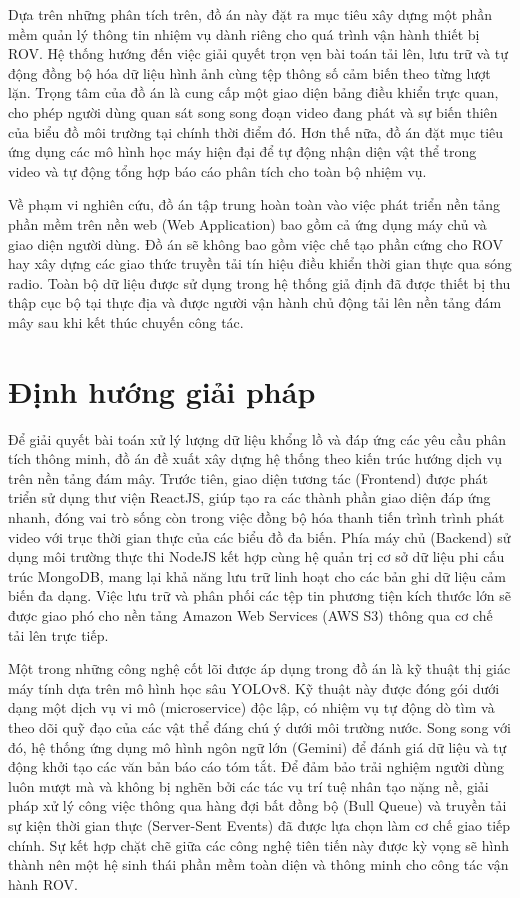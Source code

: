 \documentclass[../DoAn.tex]{subfiles}
\begin{document}
Dựa trên những phân tích trên, đồ án này đặt ra mục tiêu xây dựng một phần mềm quản lý thông tin nhiệm vụ dành riêng cho quá trình vận hành thiết bị ROV. Hệ thống hướng đến việc giải quyết trọn vẹn bài toán tải lên, lưu trữ và tự động đồng bộ hóa dữ liệu hình ảnh cùng tệp thông số cảm biến theo từng lượt lặn. Trọng tâm của đồ án là cung cấp một giao diện bảng điều khiển trực quan, cho phép người dùng quan sát song song đoạn video đang phát và sự biến thiên của biểu đồ môi trường tại chính thời điểm đó. Hơn thế nữa, đồ án đặt mục tiêu ứng dụng các mô hình học máy hiện đại để tự động nhận diện vật thể trong video và tự động tổng hợp báo cáo phân tích cho toàn bộ nhiệm vụ.

Về phạm vi nghiên cứu, đồ án tập trung hoàn toàn vào việc phát triển nền tảng phần mềm trên nền web (Web Application) bao gồm cả ứng dụng máy chủ và giao diện người dùng. Đồ án sẽ không bao gồm việc chế tạo phần cứng cho ROV hay xây dựng các giao thức truyền tải tín hiệu điều khiển thời gian thực qua sóng radio. Toàn bộ dữ liệu được sử dụng trong hệ thống giả định đã được thiết bị thu thập cục bộ tại thực địa và được người vận hành chủ động tải lên nền tảng đám mây sau khi kết thúc chuyến công tác.

\section{Định hướng giải pháp}
\label{section:1.3}
Để giải quyết bài toán xử lý lượng dữ liệu khổng lồ và đáp ứng các yêu cầu phân tích thông minh, đồ án đề xuất xây dựng hệ thống theo kiến trúc hướng dịch vụ trên nền tảng đám mây. Trước tiên, giao diện tương tác (Frontend) được phát triển sử dụng thư viện ReactJS, giúp tạo ra các thành phần giao diện đáp ứng nhanh, đóng vai trò sống còn trong việc đồng bộ hóa thanh tiến trình trình phát video với trục thời gian thực của các biểu đồ đa biến. Phía máy chủ (Backend) sử dụng môi trường thực thi NodeJS kết hợp cùng hệ quản trị cơ sở dữ liệu phi cấu trúc MongoDB, mang lại khả năng lưu trữ linh hoạt cho các bản ghi dữ liệu cảm biến đa dạng. Việc lưu trữ và phân phối các tệp tin phương tiện kích thước lớn sẽ được giao phó cho nền tảng Amazon Web Services (AWS S3) thông qua cơ chế tải lên trực tiếp.

Một trong những công nghệ cốt lõi được áp dụng trong đồ án là kỹ thuật thị giác máy tính dựa trên mô hình học sâu YOLOv8. Kỹ thuật này được đóng gói dưới dạng một dịch vụ vi mô (microservice) độc lập, có nhiệm vụ tự động dò tìm và theo dõi quỹ đạo của các vật thể đáng chú ý dưới môi trường nước. Song song với đó, hệ thống ứng dụng mô hình ngôn ngữ lớn (Gemini) để đánh giá dữ liệu và tự động khởi tạo các văn bản báo cáo tóm tắt. Để đảm bảo trải nghiệm người dùng luôn mượt mà và không bị nghẽn bởi các tác vụ trí tuệ nhân tạo nặng nề, giải pháp xử lý công việc thông qua hàng đợi bất đồng bộ (Bull Queue) và truyền tải sự kiện thời gian thực (Server-Sent Events) đã được lựa chọn làm cơ chế giao tiếp chính. Sự kết hợp chặt chẽ giữa các công nghệ tiên tiến này được kỳ vọng sẽ hình thành nên một hệ sinh thái phần mềm toàn diện và thông minh cho công tác vận hành ROV.
\end{document}
